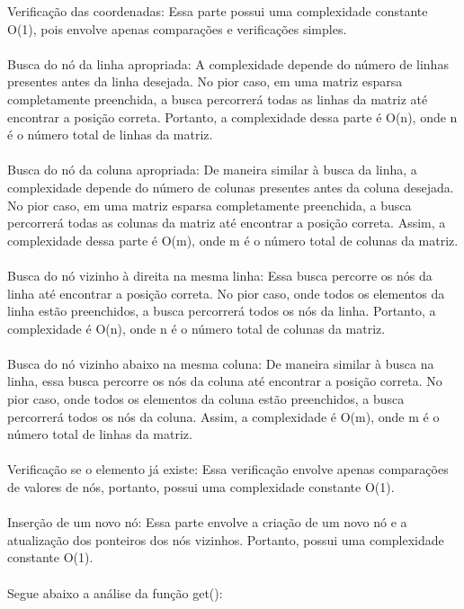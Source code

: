 \documentclass[a4paper,12pt]{article}
\begin{document}
Verificação das coordenadas: Essa parte possui uma complexidade constante O(1), pois envolve apenas comparações e verificações simples.
\\\\
Busca do nó da linha apropriada: A complexidade depende do número de linhas presentes antes da linha desejada. No pior caso, em uma matriz esparsa completamente preenchida, a busca percorrerá todas as linhas da matriz até encontrar a posição correta. Portanto, a complexidade dessa parte é O(n), onde n é o número total de linhas da matriz.
\\\\
Busca do nó da coluna apropriada: De maneira similar à busca da linha, a complexidade depende do número de colunas presentes antes da coluna desejada. No pior caso, em uma matriz esparsa completamente preenchida, a busca percorrerá todas as colunas da matriz até encontrar a posição correta. Assim, a complexidade dessa parte é O(m), onde m é o número total de colunas da matriz.
\\\\
Busca do nó vizinho à direita na mesma linha: Essa busca percorre os nós da linha até encontrar a posição correta. No pior caso, onde todos os elementos da linha estão preenchidos, a busca percorrerá todos os nós da linha. Portanto, a complexidade é O(n), onde n é o número total de colunas da matriz.
\\\\
Busca do nó vizinho abaixo na mesma coluna: De maneira similar à busca na linha, essa busca percorre os nós da coluna até encontrar a posição correta. No pior caso, onde todos os elementos da coluna estão preenchidos, a busca percorrerá todos os nós da coluna. Assim, a complexidade é O(m), onde m é o número total de linhas da matriz.
\\\\
Verificação se o elemento já existe: Essa verificação envolve apenas comparações de valores de nós, portanto, possui uma complexidade constante O(1).
\\\\
Inserção de um novo nó: Essa parte envolve a criação de um novo nó e a atualização dos ponteiros dos nós vizinhos. Portanto, possui uma complexidade constante O(1).
\\\\
Segue abaixo a análise da função get():
\end{document}
